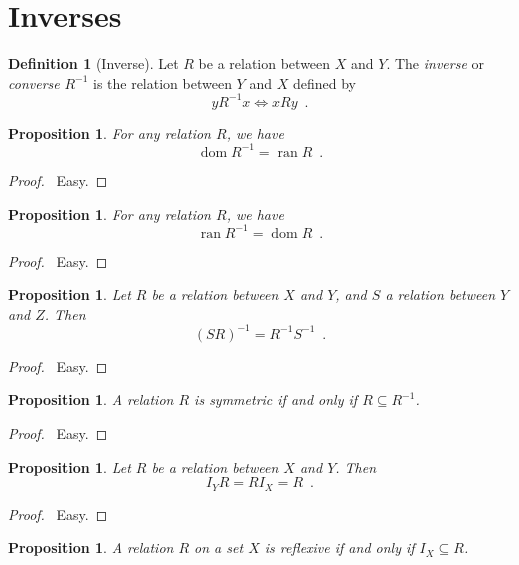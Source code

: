 \documentclass{report}
\let\qed\relax
\newtheorem{prop}[ax]{Proposition}
\theoremstyle{definition}
\newtheorem{df}[ax]{Definition}
\newcommand{\dom}{\ensuremath{\operatorname{dom}}}
\newcommand{\ran}{\ensuremath{\operatorname{ran}}}
\begin{document}
\section{Inverses}

\begin{df}[Inverse]
Let $R$ be a relation between $X$ and $Y$. The \emph{inverse} or \emph{converse} $R^{-1}$ is the relation between $Y$ and $X$ defined by
\[ y R^{-1} x \Leftrightarrow x R y \enspace . \]
\end{df}

\begin{prop}
For any relation $R$, we have
\[ \dom R^{-1} = \ran R \enspace . \]
\end{prop}

\begin{proof}
\pf\ Easy. \qed
\end{proof}

\begin{prop}
For any relation $R$, we have
\[ \ran R^{-1} = \dom R \enspace . \]
\end{prop}

\begin{proof}
\pf\ Easy. \qed
\end{proof}

\begin{prop}
Let $R$ be a relation between $X$ and $Y$, and $S$ a relation between $Y$ and $Z$. Then
\[ (SR)^{-1} = R^{-1}S^{-1} \enspace . \]
\end{prop}

\begin{proof}
\pf\ Easy. \qed
\end{proof}

\begin{prop}
A relation $R$ is symmetric if and only if $R \subseteq R^{-1}$.
\end{prop}

\begin{proof}
\pf\ Easy. \qed
\end{proof}

\begin{prop}
Let $R$ be a relation between $X$ and $Y$. Then
\[ I_Y R = R I_X = R \enspace . \]
\end{prop}

\begin{proof}
\pf\ Easy. \qed
\end{proof}

\begin{prop}
A relation $R$ on a set $X$ is reflexive if and only if $I_X \subseteq R$.
\end{prop}
\end{document}
